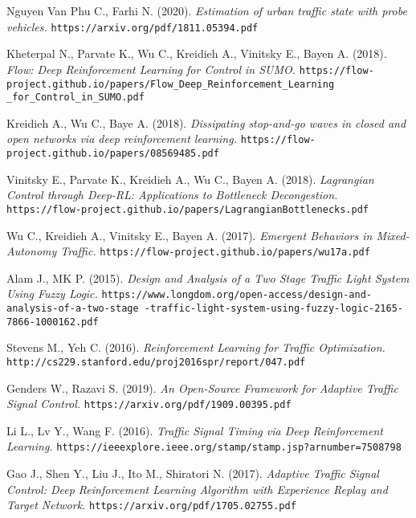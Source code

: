 \begin{thebibliography}{99}
Nguyen Van Phu C., Farhi N. (2020).
\textit{Estimation of urban traffic state with probe vehicles.}
\texttt{https://arxiv.org/pdf/1811.05394.pdf}

Kheterpal N., Parvate K., Wu C., Kreidieh A., Vinitsky E., Bayen A. (2018).
\textit{Flow: Deep Reinforcement Learning for Control in SUMO.}
\texttt{https://flow-project.github.io/papers/Flow\_Deep\_Reinforcement\_Learning \_for\_Control\_in\_SUMO.pdf}

Kreidieh A., Wu C., Baye A. (2018).
\textit{Dissipating stop-and-go waves in closed and open networks via deep reinforcement learning.}
\texttt{https://flow-project.github.io/papers/08569485.pdf}

Vinitsky E., Parvate K., Kreidieh A., Wu C., Bayen A. (2018).
\textit{Lagrangian Control through Deep-RL: Applications to Bottleneck Decongestion.}
\texttt{https://flow-project.github.io/papers/LagrangianBottlenecks.pdf}

Wu C., Kreidieh A., Vinitsky E., Bayen A. (2017).
\textit{Emergent Behaviors in Mixed-Autonomy Traffic.}
\texttt{https://flow-project.github.io/papers/wu17a.pdf}

Alam J., MK P. (2015).
\textit{Design and Analysis of a Two Stage Traffic Light System Using Fuzzy Logic.}
\texttt{https://www.longdom.org/open-access/design-and-analysis-of-a-two-stage -traffic-light-system-using-fuzzy-logic-2165-7866-1000162.pdf}

Stevens M., Yeh C. (2016).
\textit{Reinforcement Learning for Traffic Optimization.}
\texttt{http://cs229.stanford.edu/proj2016spr/report/047.pdf}

Genders W., Razavi S. (2019).
\textit{An Open-Source Framework for Adaptive Traffic Signal Control.}
\texttt{https://arxiv.org/pdf/1909.00395.pdf}

Li L., Lv Y., Wang F. (2016).
\textit{Traffic Signal Timing via Deep Reinforcement Learning.}
\texttt{https://ieeexplore.ieee.org/stamp/stamp.jsp?arnumber=7508798}

Gao J., Shen Y., Liu J., Ito M., Shiratori N. (2017).
\textit{Adaptive Traffic Signal Control: Deep Reinforcement Learning Algorithm with Experience Replay and Target Network.}
\texttt{https://arxiv.org/pdf/1705.02755.pdf}


\end{thebibliography}
